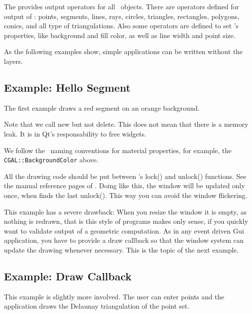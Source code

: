 The  provides output operators for all \cgal\
objects. There are operators defined for output of : points, segments, 
lines, rays, circles, triangles, rectangles, polygons, conics,  and all type of
triangulations. Also some operators are defined to set
's properties, like background and fill color, as
well as line width and point size.

As the following examples show, simple applications can be written
without the layers.

\subsection{Example: Hello Segment}
The first example draws a red segment on an orange background.

Note that we call new but not delete. This does not mean that there is 
a memory leak. It is in Qt's responsability to free widgets.

We follow the \qt\ naming conventions for material properties, for
example, the {\tt CGAL::BackgroundColor} above.

All the drawing code should be put between 's lock() and
unlock() functions. See the manual reference pages of
. Doing like this, the window will be updated only
once, when \ccStyle{Qt\_widget} finds the last unlock(). This way you
can avoid the window flickering.

This example has a severe drawback: When you resize the window it is
empty, as nothing is redrawn, that is this style of programs makes
only sense, if you quickly want to validate output of a geometric
computation. As in any event driven {\sc Gui} application, you have to provide 
a draw callback so that the window system can update the drawing
whenever necessary. This is the topic of the next example.

\subsection{Example: Draw Callback}

This example is slightly more involved. The user can enter points and
the application draws the Delaunay triangulation of the point set. 

